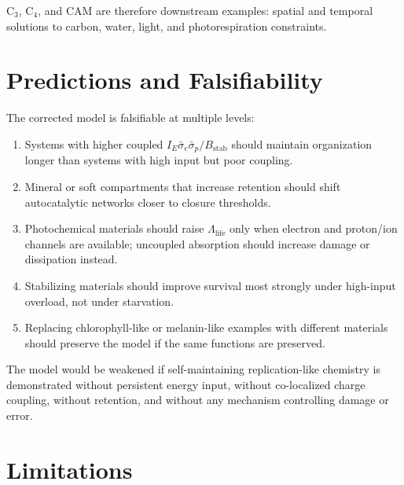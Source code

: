 \documentclass[11pt,a4paper]{article}
\begin{document}
C$_3$, C$_4$, and CAM are therefore downstream examples: spatial and temporal solutions to carbon, water, light, and photorespiration constraints.

\section{Predictions and Falsifiability}

The corrected model is falsifiable at multiple levels:

\begin{enumerate}
 \item Systems with higher coupled $I_E\bar{\sigma}_e\bar{\sigma}_p/B_{\mathrm{stab}}$ should maintain organization longer than systems with high input but poor coupling.
 \item Mineral or soft compartments that increase retention should shift autocatalytic networks closer to closure thresholds.
 \item Photochemical materials should raise $\Lambda_{\mathrm{life}}$ only when electron and proton/ion channels are available; uncoupled absorption should increase damage or dissipation instead.
 \item Stabilizing materials should improve survival most strongly under high-input overload, not under starvation.
 \item Replacing chlorophyll-like or melanin-like examples with different materials should preserve the model if the same functions are preserved.
\end{enumerate}

The model would be weakened if self-maintaining replication-like chemistry is demonstrated without persistent energy input, without co-localized charge coupling, without retention, and without any mechanism controlling damage or error.

\section{Limitations}
\end{document}
